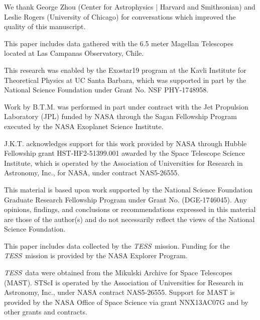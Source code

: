 \documentclass[twocolumn]{aastex63}
\newcommand{\tess}{{\it TESS}}
\begin{document}
\acknowledgements

We thank George Zhou (Center for Astrophysics $|$ Harvard and Smithsonian) and Leslie Rogers (University of Chicago) for conversations which improved the quality of this manuscript.

This paper includes data gathered with the 6.5 meter Magellan Telescopes located at Las Campanas Observatory, Chile.


This research was enabled by the Exostar19 program at the Kavli Institute for Theoretical Physics at UC Santa Barbara, which was supported in part by the National Science Foundation under Grant No. NSF PHY-1748958.


Work by B.T.M. was performed in part under contract with the Jet
Propulsion Laboratory (JPL) funded by NASA through
the Sagan Fellowship Program executed by the NASA
Exoplanet Science Institute.

J.K.T. acknowledges support for this work provided by NASA through Hubble Fellowship grant HST-HF2-51399.001 awarded by the Space Telescope Science Institute, which is operated by the Association of Universities for Research in Astronomy, Inc., for NASA, under contract NAS5-26555.

This material is based upon work supported by the National Science Foundation Graduate Research Fellowship Program under Grant No. (DGE-1746045). Any opinions, findings, and conclusions or recommendations expressed in this material are those of the author(s) and do not necessarily reflect the views of the National Science Foundation.



This paper includes data collected by the \tess\ mission. Funding for the \tess\ mission is provided by the NASA Explorer Program.

\tess\ data were obtained from the Mikulski Archive for Space Telescopes
(MAST).
STScI is operated by the Association of Universities for Research in
Astronomy, Inc., under NASA contract NAS5-26555.
Support for MAST is provided by the NASA Office of Space Science via grant
NNX13AC07G and by other grants and contracts.














\end{document}
